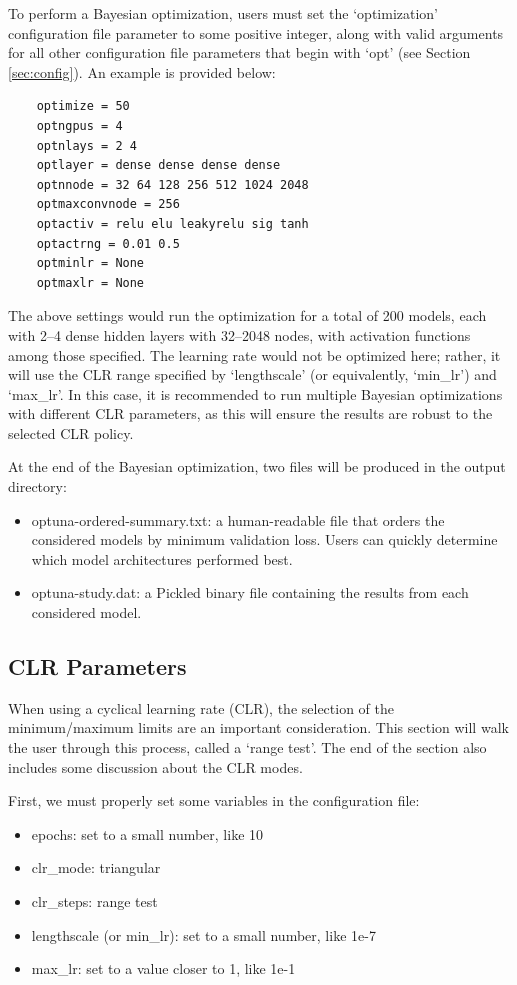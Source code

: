 \documentclass[letterpaper, 12pt]{article}
\begin{document}
\noindent To perform a Bayesian optimization, users must set the `optimization' 
configuration file parameter to some positive integer, along with valid arguments 
for all other configuration file parameters that begin with `opt' (see Section 
\ref{sec:config}).  An example is provided below:
\begin{verbatim}
	optimize = 50
	optngpus = 4
	optnlays = 2 4
	optlayer = dense dense dense dense
	optnnode = 32 64 128 256 512 1024 2048
	optmaxconvnode = 256
	optactiv = relu elu leakyrelu sig tanh
	optactrng = 0.01 0.5
	optminlr = None
	optmaxlr = None
\end{verbatim}
\noindent The above settings would run the optimization for a total of 200 models, 
each with 2--4 dense hidden layers with 32--2048 nodes, with activation functions 
among those specified.  The learning rate would not be optimized here; rather, it 
will use the CLR range specified by `lengthscale' (or equivalently, `min\_lr') and 
`max\_lr'.  In this case, it is recommended to run multiple Bayesian optimizations 
with different CLR parameters, as this will ensure the results are robust to the 
selected CLR policy.

\noindent At the end of the Bayesian optimization, two files will be produced 
in the output directory:
\begin{itemize}
	\item optuna-ordered-summary.txt: a human-readable file that orders the 
	         considered models by minimum validation loss.  Users can quickly 
	         determine which model architectures performed best.
    \item optuna-study.dat: a Pickled binary file containing the results from 
             each considered model.
\end{itemize}


\subsection{CLR Parameters}
\label{sec:clr}

When using a cyclical learning rate (CLR), the selection of the minimum/maximum 
limits are an important consideration.  This section will walk the user through 
this process, called a `range test'.  The end of the section also includes some 
discussion about the CLR modes.  \newline

\noindent First, we must properly set some variables in the configuration file:
\begin{itemize}
\item epochs: set to a small number, like 10
\item clr\_mode: triangular
\item clr\_steps: range test
\item lengthscale (or min\_lr): set to a small number, like 1e-7
\item max\_lr: set to a value closer to 1, like 1e-1
\end{itemize}
\end{document}
